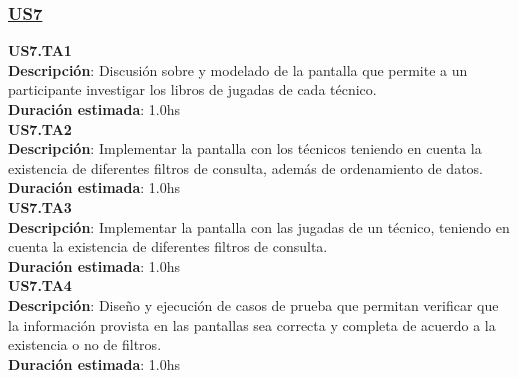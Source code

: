 \begin{tcolorbox}
\subsubsection*{\underline{US7}}
\textbf{US7.TA1} \\
\textbf{Descripción}: Discusión sobre y modelado de la pantalla que permite a un participante investigar los libros de jugadas de cada técnico.\\
\textbf{Duración estimada}: 1.0hs \\
\newline
\textbf{US7.TA2} \\
\textbf{Descripción}: Implementar la pantalla con los técnicos teniendo en cuenta la existencia de diferentes filtros de consulta, además de ordenamiento de datos.\\
\textbf{Duración estimada}: 1.0hs \\
\newline
\textbf{US7.TA3} \\
\textbf{Descripción}: Implementar la pantalla con las jugadas de un técnico, teniendo en cuenta la existencia de diferentes filtros de consulta.\\
\textbf{Duración estimada}: 1.0hs \\
\newline
\textbf{US7.TA4} \\
\textbf{Descripción}: Diseño y ejecución de casos de prueba que permitan verificar que la información provista en las pantallas sea correcta y completa de acuerdo a la existencia o no de filtros.\\
\textbf{Duración estimada}: 1.0hs
\end{tcolorbox}
\vspace{10pt}


